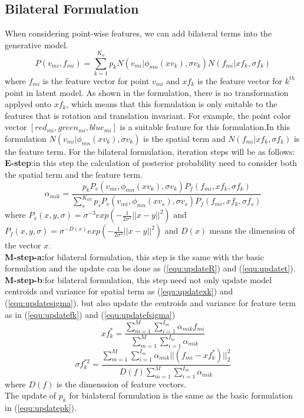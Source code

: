 \subsection{Bilateral Formulation}
When considering point-wise features, we can add bilateral terms into the generative model.
\begin{equation}
P(v_{mi},f_{mi})=\sum^{K_n}_{k=1}p_kN(v_{mi}|\phi_{mn}(xv_k),\sigma v_k)N(f_{mi}|xf_k,\sigma f_k)
\end{equation}
where $f_{mi}$ is the feature vector for point $v_{mi}$ and $xf_k$ is the feature vector for $k^{th}$ point in latent model. As shown in the formulation, there is no transformation applyed onto $xf_k$, which means that this formulation is only suitable to the features that is rotation and translation invariant. For example, the point color vector $[red_{mi},green_{mi},blue_{mi}]$ is a suitable feature for this formulation.In this formulation $N(v_{mi}|\phi_{mn}(xv_k),\sigma v_k)$ is the spatial term and $N(f_{mi}|xf_k,\sigma f_k)$ is the feature term.
For the bilateral formulation, iteration steps will be as follows:\\
\textbf{E-step}:in this step the calculation of posterior probability need to consider both the spatial term and the feature term.
\begin{equation}
\label{equ:bestep}
\alpha_{mik}=\frac{p_kP_v(v_{mi},\phi_{mn}(xv_k),\sigma v_k)P_f(f_{mi},xf_k,\sigma f_k)}{\sum_s^{K_{all}}p_sP_v(v_{mi},\phi_{mn}(xv_s),\sigma v_s)P_f(f_{mi},xf_k,\sigma f_s)}
\end{equation}
where $P_v(x,y,\sigma)=\sigma^{-3}exp(-\frac{1}{2\sigma^2}||x-y||^2)$ and $P_f(x,y,\sigma)=\sigma^{-D(x)}exp(-\frac{1}{2\sigma^2}||x-y||^2)$ and $D(x)$ means the dimension of the vector $x$.\\
\textbf{M-step-a:}for bilateral formulation, this step is the same with the basic formulation and the update can be done as (\ref{equ:updateR}) and (\ref{equ:updatet}).
\textbf{M-step-b}:for bilateral formulation, this step need not only update model centroids and variance for spatial term as (\ref{equ:updatexk}) and (\ref{equ:updatesigma}).
but also update the centroids and variance for feature term as in (\ref{equ:updatefk}) and (\ref{equ:updatefsigma})\\
\begin{equation}
\label{equ:updatefk}
xf_k^*=\frac{\sum_{m=1}^M\sum_{i=1}^{I_m}\alpha_{mik}f_{mi}}{\sum_{m=1}^M\sum_{i=1}^{I_m}\alpha_{mik}}
\end{equation}
\begin{equation}
\label{equ:updatefsigma}
\sigma f_k^{*2}=\frac{\sum_{m=1}^M\sum_{i=1}^{I_m}\alpha_{mik}||(f_{mi}-xf_k^*)||_2^2}{D(f)\sum_{m=1}^M\sum_{i=1}^{I_m}\alpha_{mik}}
\end{equation}
where $D(f)$ is the dimenssion of feature vectors.\\
The update of $p_k$ for bialateral formulation is the same as the basic formulation in (\ref{equ:updatepk}).
